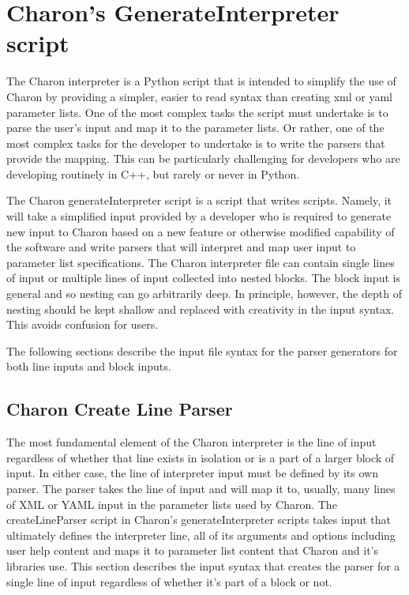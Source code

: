 

\section{Charon's GenerateInterpreter script}

The Charon interpreter is a Python script that is intended to simplify
the use of Charon by providing a simpler, easier to read syntax than
creating xml or yaml parameter lists.  One of the most complex tasks
the script must undertake is to parse the user's input and map it to
the parameter lists.  Or rather, one of the most complex tasks for the
developer to undertake is to write the parsers that provide the
mapping.  This can be particularly challenging for developers who are
developing routinely in C++, but rarely or never in Python.  

The Charon generateInterpreter script is a script that writes scripts.
Namely, it will take a simplified input provided by a developer who is
required to generate new input to Charon based on a new feature or
otherwise modified capability of the software and write parsers that
will interpret and map user input to parameter list specifications.
The Charon interpreter file can contain single lines of input or
multiple lines of input collected into nested blocks.  The block input
is general and so nesting can go arbitrarily deep.  In principle,
however, the depth of nesting should be kept shallow and replaced with
creativity in the input syntax.  This avoids confusion for users.

The following sections describe the input file syntax for the parser
generators for both line inputs and block inputs.

\subsection{Charon Create Line Parser}

The most fundamental element of the Charon interpreter is the line of
input regardless of whether that line exists in isolation or is a part
of a larger block of input.  In either case, the line of interpreter
input must be defined by its own parser.  The parser takes the line of
input and will map it to, usually, many lines of XML or YAML input in
the parameter lists used by Charon.  The createLineParser script in
Charon's generateInterpreter scripts takes input that ultimately
defines the interpreter line, all of its arguments and options
including user help content and maps it to parameter list content that
Charon and it's libraries use.  This section describes the input syntax
that creates the parser for a single line of input regardless of
whether it's part of a block or not.

